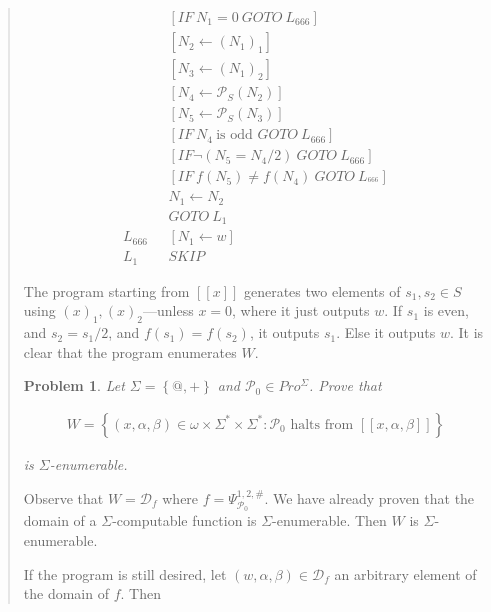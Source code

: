 \documentclass[a4paper, 12pt]{article}
\newtheorem{problem}{Problem}
\newtheorem{problem}{Problem}
\begin{document}
\begin{quote}
\begin{align*}
    &[IF ~ N_1 = 0 ~ GOTO ~ L_{666}]\\
    &[N_2 \leftarrow (N_1)_1] \\
    &[N_3 \leftarrow (N_1)_2] \\
    &[N_4 \leftarrow \mathcal{P}_S(N_2)] \\ 
    &[N_5 \leftarrow \mathcal{P}_S(N_3)] \\ 
    &[IF ~ N_4 ~ \text{is odd } GOTO ~ L_{666}] \\ 
    &[IF \neg(N_5 = N_4 / 2) ~ GOTO ~ L_{666} ] \\ 
    &[IF ~ f(N_5) \neq f(N_4) ~ GOTO ~ L_^{666}] \\ 
    &N_1 \leftarrow N_2 \\ 
    &GOTO ~ L_1 \\ 
    L_{666} ~ ~ ~ &[N_1 \leftarrow  w] \\ 
    L_1 ~ ~ ~ &SKIP
\end{align*}

The program starting from $[\![ x ]\!]$ generates two elements of $s_1, s_2 \in S$ using
$(x)_1, (x)_2$---unless $x = 0$, where it just outputs $w$. If $s_1$ is even,
and $s_2 = s_1 / 2$, and $f\left( s_1 \right) = f( s_2 ) $, it outputs $s_1$.
Else it outputs $w$. It is clear that the program enumerates $W$.

\begin{problem}
    Let $\Sigma = \left\{ @, + \right\} $ and $\mathcal{P}_0 \in Pro^{\Sigma}$.
    Prove that 

    \begin{align*}
        W = \left\{ (x, \alpha, \beta) \in \omega \times \Sigma^{*}\times \Sigma^{*}
        : \mathcal{P}_0 \text{ halts from } [\![ x, \alpha, \beta ]\!]\right\} 
    \end{align*}

    is $\Sigma$-enumerable.
\end{problem}

Observe that $W = \mathcal{D}_f$ where $f = \Psi_{\mathcal{P}_0}^{1, 2, \#}$. We
have already proven that the domain of a $\Sigma$-computable function is
$\Sigma$-enumerable. Then $W$ is $\Sigma$-enumerable.  

If the program is still desired, let $(w, \alpha, \beta) \in \mathcal{D}_f$ an
arbitrary element of the domain of $f$. Then


\end{quote}
\end{document}
